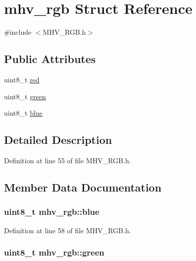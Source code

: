 \hypertarget{structmhv__rgb}{
\section{mhv\-\_\-rgb \-Struct \-Reference}
\label{structmhv__rgb}
}


{\ttfamily \#include $<$\-M\-H\-V\-\_\-\-R\-G\-B.\-h$>$}

\subsection*{\-Public \-Attributes}
\begin{DoxyCompactItemize}
\item 
uint8\-\_\-t \hyperlink{structmhv__rgb_a0f10bc24930951dba3e243614179d493}{red}
\item 
uint8\-\_\-t \hyperlink{structmhv__rgb_a8104f3c7b5b2f2bf61e5d92322cb9ec3}{green}
\item 
uint8\-\_\-t \hyperlink{structmhv__rgb_a14e5b7c703ea5890d99fcc43d9448561}{blue}
\end{DoxyCompactItemize}


\subsection{\-Detailed \-Description}


\-Definition at line 55 of file \-M\-H\-V\-\_\-\-R\-G\-B.\-h.



\subsection{\-Member \-Data \-Documentation}
\hypertarget{structmhv__rgb_a14e5b7c703ea5890d99fcc43d9448561}{
\subsubsection[{blue}]{\setlength{\rightskip}{0pt plus 5cm}uint8\-\_\-t {\bf mhv\-\_\-rgb\-::blue}}}
\label{structmhv__rgb_a14e5b7c703ea5890d99fcc43d9448561}


\-Definition at line 58 of file \-M\-H\-V\-\_\-\-R\-G\-B.\-h.

\hypertarget{structmhv__rgb_a8104f3c7b5b2f2bf61e5d92322cb9ec3}{
\subsubsection[{green}]{\setlength{\rightskip}{0pt plus 5cm}uint8\-\_\-t {\bf mhv\-\_\-rgb\-::green}}}
\label{structmhv__rgb_a8104f3c7b5b2f2bf61e5d92322cb9ec3}


